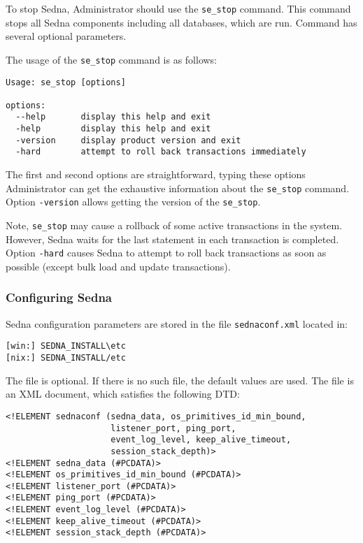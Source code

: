 \documentclass[a4paper,12pt]{article}
\begin{document}
To stop Sedna, Administrator should use the \verb!se_stop! command. This command
stops all Sedna components including all databases, which are run. Command has
several optional parameters. 

The usage of the \verb!se_stop! command is as follows:

\small{
\begin{verbatim}
Usage: se_stop [options]

options:
  --help       display this help and exit
  -help        display this help and exit
  -version     display product version and exit
  -hard        attempt to roll back transactions immediately
\end{verbatim}}

The first and second options are straightforward, typing these options
Administrator can get the exhaustive information about the \verb!se_stop!
command. Option \verb!-version! allows getting the version of the
\verb!se_stop!.

Note, \verb!se_stop! may cause a rollback of some active transactions in the
system. However, Sedna waits for the last statement in each transaction is
completed. Option \verb!-hard! causes Sedna to attempt to roll back transactions
as soon as possible (except bulk load and update transactions).


\subsubsection{Configuring Sedna}
\label{sec:ConfigSedna}
Sedna configuration parameters are stored in the file \verb!sednaconf.xml!
located in:

\begin{verbatim}
[win:] SEDNA_INSTALL\etc
[nix:] SEDNA_INSTALL/etc
\end{verbatim}

The file is optional. If there is no such file, the default values are used.
The file is an XML document, which satisfies the following DTD:

\small{
\begin{verbatim}
<!ELEMENT sednaconf (sedna_data, os_primitives_id_min_bound, 
                     listener_port, ping_port,
                     event_log_level, keep_alive_timeout, 
                     session_stack_depth)>
<!ELEMENT sedna_data (#PCDATA)>
<!ELEMENT os_primitives_id_min_bound (#PCDATA)>
<!ELEMENT listener_port (#PCDATA)>
<!ELEMENT ping_port (#PCDATA)>
<!ELEMENT event_log_level (#PCDATA)>
<!ELEMENT keep_alive_timeout (#PCDATA)>
<!ELEMENT session_stack_depth (#PCDATA)>
\end{verbatim}}
\end{document}
